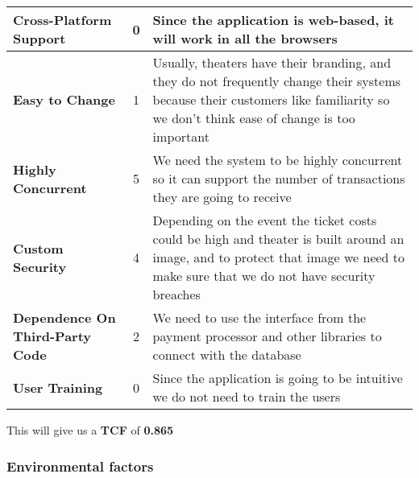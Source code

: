 \begin{center}
    \begin{tabular}{|l | c | p{7cm}|} 
        \hline
        \textbf{Cross-Platform Support} & 0 & Since the application is web-based, it will work in all the browsers \\
        \hline
        \textbf{Easy to Change} & 1 & Usually, theaters have their branding, and they do not frequently change their systems because their customers like familiarity so we don't think ease of change is too important \\
        \hline
        \textbf{Highly Concurrent} & 5 & We need the system to be highly concurrent so it can support the number of transactions they are going to receive \\
        \hline
        \textbf{Custom Security} & 4 & Depending on the event the ticket costs could be high and theater is built around an image, and to protect that image we need to make sure that we do not have security breaches  \\
        \hline
        \textbf{Dependence On Third-Party Code} & 2 & We need to use the interface from the payment processor and other libraries to connect with the database \\
        \hline
        \textbf{User Training} & 0 & Since the application is going to be intuitive we do not need to train the users \\
        \hline
    \end{tabular}
\end{center}

\noindent
This will give us a \textbf{TCF} of \textbf{0.865}

\pagebreak

\subsubsection{Environmental factors}

